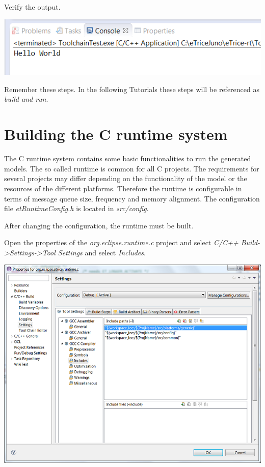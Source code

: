 Verify the output.

\includegraphics{images/032-SetupWorkspaceC07.png}

Remember these steps. In the following Tutorials these steps will be referenced as \textit{build and run}.


\section{Building the C runtime system}

The C runtime system contains some basic functionalities to run the generated models. The so called 
runtime is common for all C projects. The requirements for several projects may differ depending on the 
functionality of the model or the resources of the different platforms. Therefore the runtime is 
configurable in terms of message queue size, frequency and memory alignment. The configuration file 
\textit{etRuntimeConfig.h} is located in \textit{src/config}.

After changing the configuration, the runtime must be built.

Open the properties of the \textit{org.eclipse.runtime.c} project and select \textit{C/C++ 
Build->Settings->Tool Settings} and select \textit{Includes}.

\includegraphics{images/032-SetupWorkspaceC08.png}

